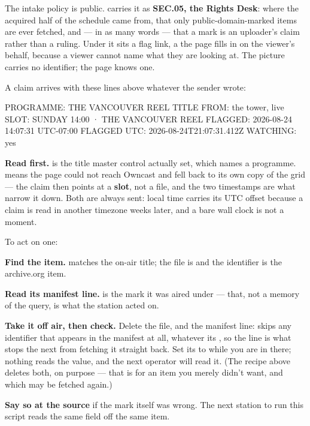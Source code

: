 \documentclass[fontpath=fonts/,logopath=logo/]{riposte-doc}
\begin{document}

The intake policy is public.  carries it as \textbf{SEC.05, the Rights Desk}: where the acquired half of the schedule came from, that only public-domain-marked items are ever fetched, and — in as many words — that a mark is an uploader's claim rather than a ruling. Under it sits a flag link, a  the page fills in on the viewer's behalf, because a viewer cannot name what they are looking at. The picture carries no identifier; the page knows one.

A claim arrives with these lines above whatever the sender wrote:

\ripcodeopen
{}
\begin{ripcodeblock}
PROGRAMME:   THE VANCOUVER REEL
TITLE FROM:  the tower, live
SLOT:        SUNDAY 14:00 · THE VANCOUVER REEL
FLAGGED:     2026-08-24 14:07:31 UTC-07:00
FLAGGED UTC: 2026-08-24T21:07:31.412Z
WATCHING:    yes
\end{ripcodeblock}
\ripcodesizereset\ripcodeclose

\textbf{Read  first.}  is the title master control actually set, which names a programme.  means the page could not reach Owncast and fell back to its own copy of the grid — the claim then points at a \textbf{slot}, not a file, and the two timestamps are what narrow it down. Both are always sent: local time carries its UTC offset because a claim is read in another timezone weeks later, and a bare wall clock is not a moment.

To act on one:

\begin{ripnumbers}
\item \textbf{Find the item.}  matches the on-air title; the file is  and the identifier is the archive.org item. 
\item \textbf{Read its manifest line.}  is the mark it was aired under — that, not a memory of the query, is what the station acted on.
\item \textbf{Take it off air, then check.} Delete the file, and  the manifest line:  skips any identifier that appears in the manifest at all, whatever its , so the line is what stops the next  from fetching it straight back. Set its  to  while you are in there; nothing reads the value, and the next operator will read it. (The  recipe above deletes both, on purpose — that is for an item you merely didn't want, and which may be fetched again.)
\item \textbf{Say so at the source} if the mark itself was wrong. The next station to run this script reads the same field off the same item.
\end{ripnumbers}
\end{document}
